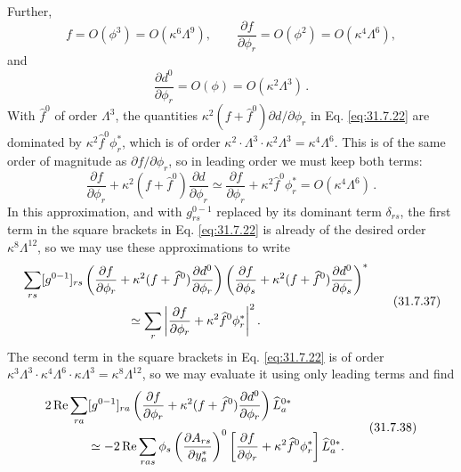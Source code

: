 Further,
\begin{equation}
  f=O(\phi^3)=O(\kappa^6\Lambda^9),\qquad
  \frac{\partial f}{\partial\phi_r}
  =O(\phi^2)=O(\kappa^4\Lambda^6),
  \tag{31.7.34}\label{eq:31.7.34}
\end{equation}
and
\begin{equation}
  \frac{\partial d^0}{\partial\phi_r}
  =O(\phi)=O(\kappa^2\Lambda^3)\,.
  \tag{31.7.35}\label{eq:31.7.35}
\end{equation}
With \(\widehat f^0\) of order \(\Lambda^3\), the quantities
\(\kappa^2(f+\widehat f^0)\partial d/\partial\phi_r\) in
Eq. \eqref{eq:31.7.22} are dominated by
\(\kappa^2\widehat f^0\phi_r^*\), which is of order
\(\kappa^2\cdot\Lambda^3\cdot\kappa^2\Lambda^3
=\kappa^4\Lambda^6\). This is of the same order of magnitude as
\(\partial f/\partial\phi_r\), so in leading order we must keep both terms:
\begin{equation}
  \frac{\partial f}{\partial\phi_r}
  +\kappa^2(f+\widehat f^0)\frac{\partial d}{\partial\phi_r}
  \simeq
  \frac{\partial f}{\partial\phi_r}
  +\kappa^2\widehat f^0\phi_r^*
  =O(\kappa^4\Lambda^6)\,.
  \tag{31.7.36}\label{eq:31.7.36}
\end{equation}
In this approximation, and with \(g_{rs}^{0-1}\) replaced by its dominant
term \(\delta_{rs}\), the first term in the square brackets in
Eq. \eqref{eq:31.7.22} is already of the desired order
\(\kappa^8\Lambda^{12}\), so we may use these approximations to write
\begin{equation}
  \begin{aligned}
  &\sum_{rs}[g^{0-1}]_{rs}
  \left(
    \frac{\partial f}{\partial\phi_r}
    +\kappa^2(f+\widehat f^0)\frac{\partial d^0}{\partial\phi_r}
  \right)
  \left(
    \frac{\partial f}{\partial\phi_s}
    +\kappa^2(f+\widehat f^0)\frac{\partial d^0}{\partial\phi_s}
  \right)^*
  \\
  &\hspace{30mm}\simeq
  \sum_r\left|
    \frac{\partial f}{\partial\phi_r}
    +\kappa^2\widehat f^0\phi_r^*
  \right|^2 .
  \end{aligned}
  \tag{31.7.37}\label{eq:31.7.37}
\end{equation}
The second term in the square brackets in Eq. \eqref{eq:31.7.22} is of
order
\(\kappa^3\Lambda^3\cdot\kappa^4\Lambda^6\cdot\kappa\Lambda^3
=\kappa^8\Lambda^{12}\), so we may evaluate it using only leading terms and
find
\begin{equation}
  \begin{aligned}
  &2\operatorname{Re}\sum_{ra}[g^{0-1}]_{ra}
  \left(
    \frac{\partial f}{\partial\phi_r}
    +\kappa^2(f+\widehat f^0)\frac{\partial d^0}{\partial\phi_r}
  \right)\widehat L_a^{0*}
  \\
  &\hspace{12mm}\simeq
  -2\operatorname{Re}\sum_{ras}\phi_s
  \left(\frac{\partial A_{rs}}{\partial y_a^*}\right)^0
  \left[
    \frac{\partial f}{\partial\phi_r}
    +\kappa^2\widehat f^0\phi_r^*
  \right]\widehat L_a^{0*}.
  \end{aligned}
  \tag{31.7.38}\label{eq:31.7.38}
\end{equation}
